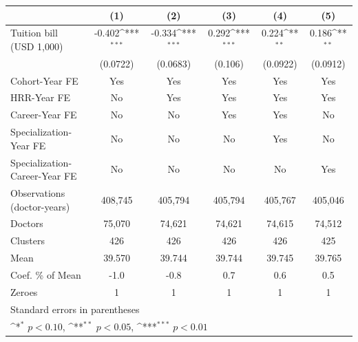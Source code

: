 {
\def\sym#1{\ifmmode^{#1}\else\(^{#1}\)\fi}
\begin{tabular}{l*{5}{c}}
\hline\hline
                    &\multicolumn{1}{c}{(1)}         &\multicolumn{1}{c}{(2)}         &\multicolumn{1}{c}{(3)}         &\multicolumn{1}{c}{(4)}         &\multicolumn{1}{c}{(5)}         \\
\hline
Tuition bill (USD 1,000)&      -0.402\sym{***}&      -0.334\sym{***}&       0.292\sym{***}&       0.224\sym{**} &       0.186\sym{**} \\
                    &    (0.0722)         &    (0.0683)         &     (0.106)         &    (0.0922)         &    (0.0912)         \\
[1em]
Cohort-Year FE      &         Yes         &         Yes         &         Yes         &         Yes         &         Yes         \\
[1em]
HRR-Year FE         &          No         &         Yes         &         Yes         &         Yes         &         Yes         \\
[1em]
Career-Year FE      &          No         &          No         &         Yes         &         Yes         &          No         \\
[1em]
Specialization-Year FE&          No         &          No         &          No         &         Yes         &          No         \\
[1em]
Specialization-Career-Year FE&          No         &          No         &          No         &          No         &         Yes         \\
\hline
Observations (doctor-years)&     408,745         &     405,794         &     405,794         &     405,767         &     405,046         \\
Doctors             &      75,070         &      74,621         &      74,621         &      74,615         &      74,512         \\
Clusters            &         426         &         426         &         426         &         426         &         425         \\
Mean                &      39.570         &      39.744         &      39.744         &      39.745         &      39.765         \\
Coef. \% of Mean    &        -1.0         &        -0.8         &         0.7         &         0.6         &         0.5         \\
Zeroes              &           1         &           1         &           1         &           1         &           1         \\
\hline\hline
\multicolumn{6}{l}{\footnotesize Standard errors in parentheses}\\
\multicolumn{6}{l}{\footnotesize \sym{*} \(p<0.10\), \sym{**} \(p<0.05\), \sym{***} \(p<0.01\)}\\
\end{tabular}
}
